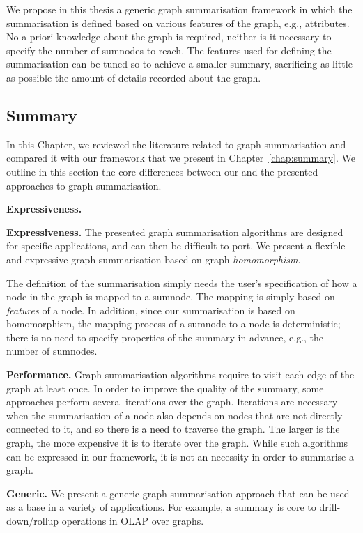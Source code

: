 We propose in this thesis a generic graph summarisation framework in which the summarisation is defined based on various features of the graph, e.g., attributes. No a priori knowledge about the graph is required, neither is it necessary to specify the number of sumnodes to reach. The features used for defining the summarisation can be tuned so to achieve a smaller summary, sacrificing as little as possible the amount of details recorded about the graph.

%

\subsection{Summary}

In this Chapter, we reviewed the literature related to graph summarisation and compared it with our framework that we present in Chapter~\ref{chap:summary}. We outline in this section the core differences between our and the presented approaches to graph summarisation.

\begin{labeling}{\textbf{Expressiveness.}}
	\item[\textbf{Expressiveness.}] The presented graph summarisation algorithms are designed for specific applications, and can then be difficult to port. We present a flexible and expressive graph summarisation based on graph \emph{homomorphism}.
	
	The definition of the summarisation simply needs the user's specification of how a node in the graph is mapped to a sumnode. The mapping is simply based on \emph{features} of a node. In addition, since our summarisation is based on homomorphism, the mapping process of a sumnode to a node is deterministic; there is no need to specify properties of the summary in advance, e.g., the number of sumnodes.
	\item[\textbf{Performance.}] Graph summarisation algorithms require to visit each edge of the graph at least once. In order to improve the quality of the summary, some approaches \cite{zheng:ipsj:2011} perform several iterations over the graph. Iterations are necessary when the summarisation of a node also depends on nodes that are not directly connected to it, and so there is a need to traverse the graph. The larger is the graph, the more expensive it is to iterate over the graph. While such algorithms can be expressed in our framework, it is not an necessity in order to summarise a graph.
	\item[\textbf{Generic.}] We present a generic graph summarisation approach that can be used as a base in a variety of applications. For example, a summary is core to drill-down/rollup operations in OLAP over graphs.
\end{labeling}

